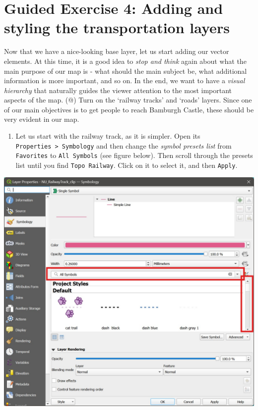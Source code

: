 \documentclass[
  letterpaper,
  DIV=11,
  numbers=noendperiod]{scrreprt}
\providecommand{\tightlist}{%
  \setlength{\itemsep}{0pt}\setlength{\parskip}{0pt}}\usepackage{longtable,booktabs,array}
\begin{document}
\section{Guided Exercise 4: Adding and styling the transportation
layers}\label{guided-exercise-4-adding-and-styling-the-transportation-layers}

Now that we have a nice-looking base layer, let us start adding our
vector elements. At this time, it is a good idea to \emph{stop and
think} again about what the main purpose of our map is - what should the
main subject be, what additional information is more important, and so
on. In the end, we want to have a \emph{visual hierarchy} that naturally
guides the viewer attention to the most important aspects of the map.
(@) Turn on the `railway tracks' and `roads' layers. Since one of our
main objectives is to get people to reach Bamburgh Castle, these should
be very evident in our map.

\begin{enumerate}
\def\labelenumi{(\arabic{enumi})}
\setcounter{enumi}{205}
\tightlist
\item
  Let us start with the railway track, as it is simpler. Open its
  \texttt{Properties\ \textgreater{}\ Symbology} and then change the
  \emph{symbol presets list} from \texttt{Favorites} to
  \texttt{All\ Symbols} (see figure below). Then scroll through the
  presets list until you find \texttt{Topo\ Railway}. Click on it to
  select it, and then \texttt{Apply}.
\end{enumerate}

\includegraphics{images/lab_7/lab7_fig8_symb.jpg}
\end{document}
